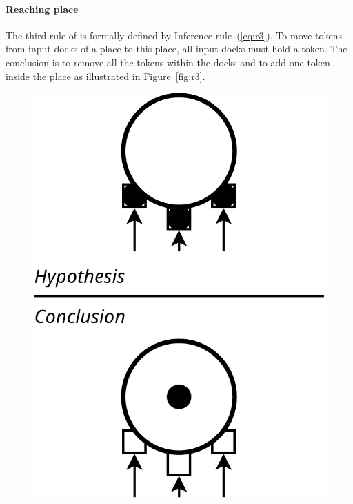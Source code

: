 \paragraph{Reaching place}{

The third rule of \mad is formally defined by
Inference rule~(\ref{eq:r3}). To move tokens from input docks of a place to
this place, all input docks must hold a token. The conclusion is to remove
all the tokens within the docks and to add one token inside the
place as illustrated in Figure~\ref{fig:r3}.

\begin{figure}[t]

\begin{minipage}[h]{0.45\columnwidth}%
  \centering
  \includegraphics[width=0.65\columnwidth]{./images/inputdocks_to_place.pdf}
\end{minipage}
\hfill
\begin{minipage}[h]{0.45\columnwidth}%
  \centering

\end{minipage}
\end{figure}}
